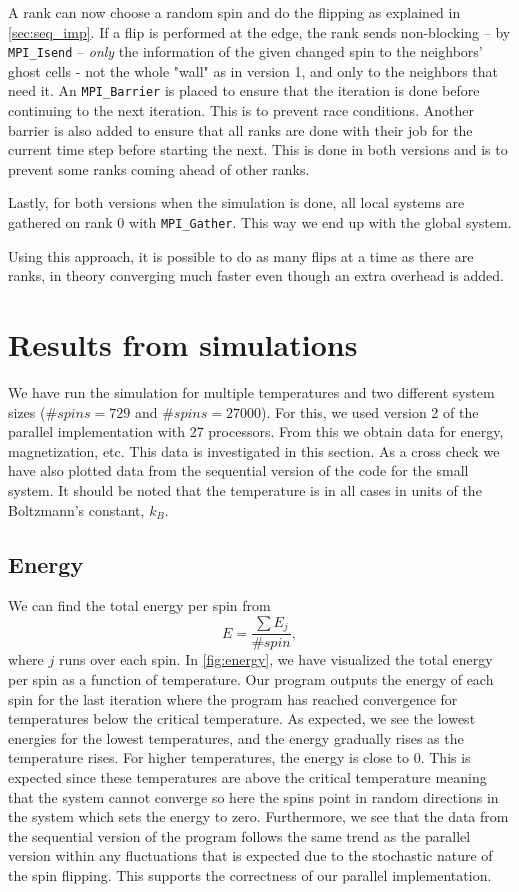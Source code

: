 \documentclass{article}
\begin{document}
A rank can now choose a random spin and do the flipping as explained in \cref{sec:seq_imp}. If a flip is performed at the edge, the rank sends non-blocking -- by \texttt{MPI\_Isend} -- \textit{only} the information of the given changed spin to the neighbors' ghost cells - not the whole "wall" as in version 1, and only to the neighbors that need it. An \texttt{MPI\_Barrier} is placed to ensure that the iteration is done before continuing to the next iteration. This is to prevent race conditions. Another barrier is also added to ensure that all ranks are done with their job for the current time step before starting the next. This is done in both versions and is to prevent some ranks coming ahead of other ranks.

Lastly, for both versions when the simulation is done, all local systems are gathered on rank 0 with \texttt{MPI\_Gather}. This way we end up with the global system.

Using this approach, it is possible to do as many flips at a time as there are ranks, in theory converging much faster even though an extra overhead is added.

\section{Results from simulations}
We have run the simulation for multiple temperatures and two different system sizes ($\#spins=729$ and $\#spins=27000$). For this, we used version 2 of the parallel implementation with 27 processors. From this we obtain data for energy, magnetization, etc. This data is investigated in this section. As a cross check we have also plotted data from the sequential version of the code for the small system. It should be noted that the temperature is in all cases in units of the Boltzmann's constant, $k_B$.  

\subsection{Energy}
We can find the total energy per spin from
\begin{equation}
    E = \frac{\sum{E_{j}}}{\#spin},
\end{equation}
where $j$ runs over each spin. In \cref{fig:energy}, we have visualized the total energy per spin as a function of temperature. Our program outputs the energy of each spin for the last iteration where the program has reached convergence for temperatures below the critical temperature. As expected, we see the lowest energies for the lowest temperatures, and the energy gradually rises as the temperature rises. For higher temperatures, the energy is close to 0. This is expected since these temperatures are above the critical temperature meaning that the system cannot converge so here the spins point in random directions in the system which sets the energy to zero. Furthermore, we see that the data from the sequential version of the program follows the same trend as the parallel version within any fluctuations that is expected due to the stochastic nature of the spin flipping. This supports the correctness of our parallel implementation.
\end{document}
